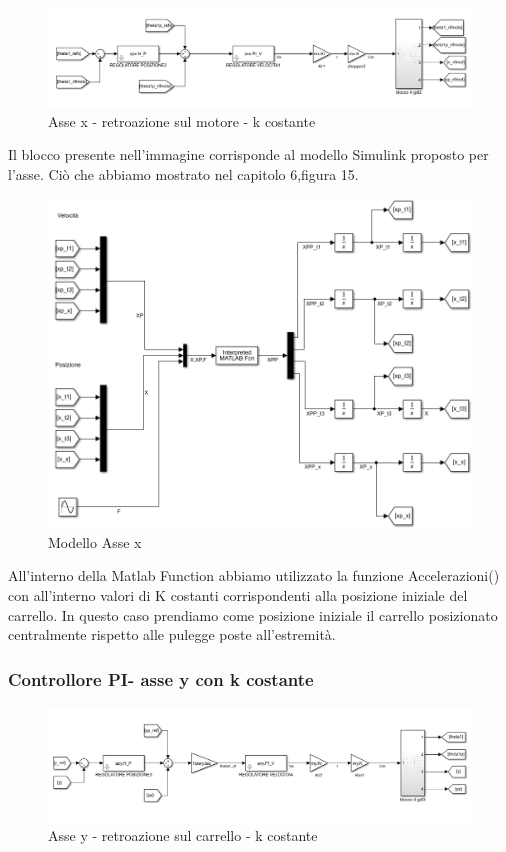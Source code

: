 \documentclass{article}
\begin{document}
\begin{figure}[H]
\centering
\includegraphics[width=.8\textwidth]{./simulink/ldm_variabile/PIDX_RMOTORE}
\caption{Asse x - retroazione sul motore - k costante }
\end{figure}
Il blocco presente nell'immagine corrisponde al modello Simulink proposto per l'asse. Ciò che abbiamo mostrato nel capitolo 6,figura 15.
\begin{figure}[H]
    \centering
    \includegraphics[width=.8\textwidth]{./simulink/assex/modellox.png}
    \caption{Modello Asse x}
\end{figure}
All'interno della Matlab Function abbiamo utilizzato la funzione Accelerazioni() con all'interno valori di K costanti corrispondenti alla posizione iniziale del carrello. In questo caso prendiamo come posizione iniziale il carrello posizionato centralmente rispetto alle pulegge poste all'estremità.

\subsubsection{Controllore PI- asse y con k costante }

\begin{figure}[H]
\centering
\includegraphics[width=.8\textwidth]{./simulink/ldm_variabile/PIDY_RCARRELLO}
\caption{Asse y - retroazione sul carrello - k costante}
\end{figure}
\end{document}
